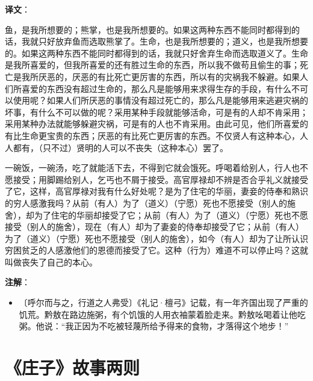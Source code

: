 \documentclass[12pt,UTF-8,openany]{ctexbook}
\begin{document}
\newpage

\textbf{译文}：

\vspace{1em}

\begin{normalsize}
    
    鱼，是我所想要的；熊掌，也是我所想要的。如果这两种东西不能同时都得到的话，我就只好放弃鱼而选取熊掌了。生命，也是我所想要的；道义，也是我所想要的。如果这两种东西不能同时都得到的话，我就只好舍弃生命而选取道义了。生命是我所喜爱的，但我所喜爱的还有胜过生命的东西，所以我不做苟且偷生的事；死亡是我所厌恶的，厌恶的有比死亡更厉害的东西，所以有的灾祸我不躲避。如果人们所喜爱的东西没有超过生命的，那么凡是能够用来求得生存的手段，有什么不可以使用呢？如果人们所厌恶的事情没有超过死亡的，那么凡是能够用来逃避灾祸的坏事，有什么不可以做的呢？采用某种手段就能够活命，可是有的人却不肯采用；采用某种办法就能够躲避灾祸，可是有的人也不肯采用。由此可见，他们所喜爱的有比生命更宝贵的东西；厌恶的有比死亡更厉害的东西。不仅贤人有这种本心，人人都有，（只不过）贤明的人可以不丧失（这种本心）罢了。
    
    一碗饭，一碗汤，吃了就能活下去，不得到它就会饿死。呼喝着给别人，行人也不愿接受；用脚踢给别人，乞丐也不屑于接受。高官厚禄却不辨是否合乎礼义就接受了它，这样，高官厚禄对我有什么好处呢？是为了住宅的华丽，妻妾的侍奉和熟识的穷人感激我吗？从前（有人）为了（道义）（宁愿）死也不愿接受（别人的施舍），却为了住宅的华丽却接受了它；从前（有人）为了（道义）（宁愿）死也不愿接受（别人的施舍），现在（有人）却为了妻妾的侍奉却接受了它；从前（有人）为了（道义）（宁愿）死也不愿接受（别人的施舍），如今（有人）却为了让所认识穷困贫乏的人感激他们的恩德而接受了它。这种（行为）难道不可以停止吗？这就叫做丧失了自己的本心。
    
\end{normalsize}


\newpage

\textbf{注解}：

\vspace{-1em}

\begin{itemize}
    \setlength\itemsep{-0.2em}
    \item〔呼尔而与之，行道之人弗受〕《礼记·檀弓》记载，有一年齐国出现了严重的饥荒。黔敖在路边施粥，有个饥饿的人用衣袖蒙着脸走来。黔敖吆喝着让他吃粥。他说：“我正因为不吃被轻蔑所给予得来的食物，才落得这个地步！”
\end{itemize}

\chapter{《庄子》故事两则}
\end{document}
